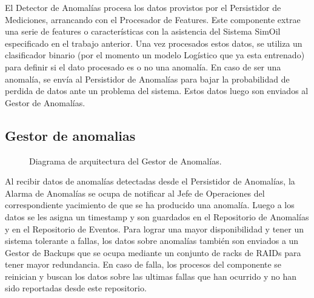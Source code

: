 \documentclass{article}
\theoremstyle{definition}
\theoremstyle{remark}
\begin{document}
El Detector de Anomalías procesa los datos provistos por el Persistidor de Mediciones, arrancando con el Procesador de Features. Este componente extrae una serie de features o características con la asistencia del Sistema SimOil especificado en el trabajo anterior. Una vez procesados estos datos, se utiliza un clasificador binario (por el momento un modelo Logístico que ya esta entrenado) para definir si el dato procesado es o no una anomalía. En caso de ser una anomalía, se envía al Persistidor de Anomalías para bajar la probabilidad de perdida de datos ante un problema del sistema. Estos datos luego son enviados al Gestor de Anomalías.

\subsection{Gestor de anomalias} \label{gestor_anomalias}

\begin{figure}[H]
  \caption{Diagrama de arquitectura del Gestor de Anomalías.}
\end{figure}

Al recibir datos de anomalías detectadas desde el Persistidor de Anomalías, la Alarma de Anomalías se ocupa de notificar al Jefe de Operaciones del correspondiente yacimiento de que se ha producido una anomalía. Luego a los datos se les asigna un timestamp y son guardados en el Repositorio de Anomalías y en el Repositorio de Eventos. Para lograr una mayor disponibilidad y tener un sistema tolerante a fallas, los datos sobre anomalías también son enviados a un Gestor de Backups que se ocupa mediante un conjunto de racks de RAIDs para tener mayor redundancia. En caso de falla, los procesos del componente se reinician y buscan los datos sobre las ultimas fallas que han ocurrido y no han sido reportadas desde este repositorio.
\end{document}
